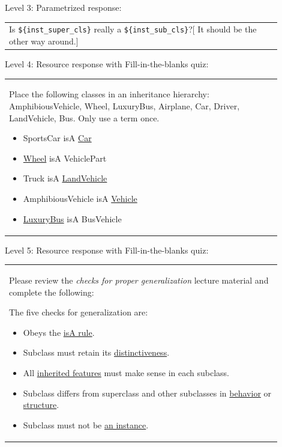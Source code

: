 \noindent Level 3: Parametrized response: \medskip

\begin{tabular}{|p{0.9\linewidth}}
Is \verb|${inst_super_cls}| really a \verb|${inst_sub_cls}|?[ It should be the other way around.]
\end{tabular} \medskip

\noindent Level 4: Resource response with Fill-in-the-blanks quiz: \medskip

\begin{tabular}{|p{0.9\linewidth}}

Place the following classes in an inheritance hierarchy: AmphibiousVehicle, Wheel, LuxuryBus, Airplane, Car, Driver, LandVehicle, Bus. Only use a term once.

\begin{itemize}
    \item SportsCar isA \underline{Car}
    \item \underline{Wheel} isA VehiclePart
    \item Truck isA \underline{LandVehicle}
    \item AmphibiousVehicle isA \underline{Vehicle}
    \item \underline{LuxuryBus} isA BusVehicle
\end{itemize}

\end{tabular} \medskip

\noindent Level 5: Resource response with Fill-in-the-blanks quiz: \medskip

\begin{tabular}{|p{0.9\linewidth}}

Please review the \textit{checks for proper generalization} lecture material
and complete the following:

The five checks for generalization are:

\begin{itemize}
    \item Obeys the \underline{isA rule}.
    \item Subclass must retain its \underline{distinctiveness}.
    \item All \underline{inherited features} must make sense in each subclass.
    \item Subclass differs from superclass and other subclasses in \underline{behavior} or \underline{structure}.
    \item Subclass must not be \underline{an instance}.
\end{itemize}

\end{tabular} \medskip

